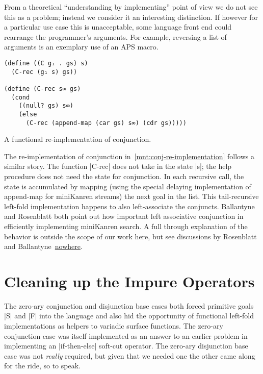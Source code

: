 \documentclass[sigplan,screen,draft,anonymous,review,natbib=false]{acmart}
\begin{document}
From a theoretical \enquote{understanding by implementing} point of
view we do not see this as a problem; instead we consider it an
interesting distinction. If however for a particular use case this is
unacceptable, some language front end could rearrange the programmer's
arguments. For example, reversing a list of arguments is an exemplary
use of an APS macro.

\begin{listing}
  \begin{verbatim}
(define ((C g₁ . gs) s)
  (C-rec (g₁ s) gs))

(define (C-rec s∞ gs)
  (cond
    ((null? gs) s∞)
    (else
      (C-rec (append-map (car gs) s∞) (cdr gs)))))
  \end{verbatim}
  \caption{A functional re-implementation of conjunction.}
  \label{mnt:conj-re-implementation}
\end{listing}

The re-implementation of conjunction
in~\cref{mnt:conj-re-implementation} follows a similar story. The
function \rackinline|C-rec| does not take in the state \rackinline|s|;
the help procedure does not need the state for conjunction. In each
recursive call, the state is accumulated by mapping (using the special
delaying implementation of append-map for miniKanren streams) the next
goal in the list. This tail-recursive left-fold implementation happens
to also left-associate the conjuncts. Ballantyne and Rosenblatt both
point out how important left associative conjunction in efficiently
implementing miniKanren search. A full through explanation of the
behavior is outside the scope of our work here, but see discussions by
Rosenblatt and Ballantyne~\href{here}{nowhere}.


\section{Cleaning up the Impure Operators}\label{sec:impure}

The zero-ary conjunction and disjunction base cases both forced
primitive goals \rackinline|S| and \rackinline|F| into the language
and also hid the opportunity of functional left-fold implementations
as helpers to variadic surface functions. The zero-ary conjunction
case was itself implemented as an answer to an earlier problem in
implementing an \rackinline|if-then-else| soft-cut operator. The
zero-ary disjunction base case was not \emph{really} required, but
given that we needed one the other came along for the ride, so to
speak.
\end{document}

